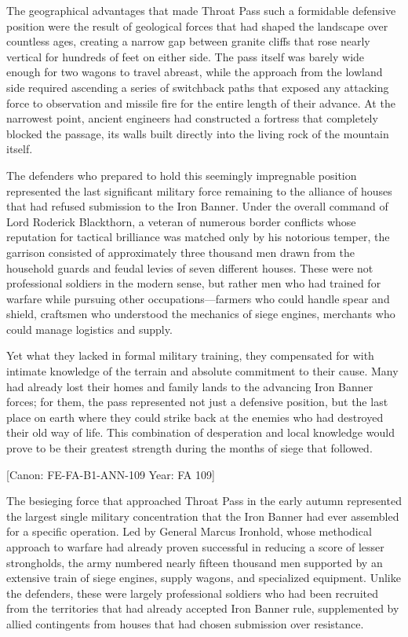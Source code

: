 The geographical advantages that made Throat Pass such a formidable
defensive position were the result of geological forces that had shaped
the landscape over countless ages, creating a narrow gap between granite
cliffs that rose nearly vertical for hundreds of feet on either side.
The pass itself was barely wide enough for two wagons to travel abreast,
while the approach from the lowland side required ascending a series of
switchback paths that exposed any attacking force to observation and
missile fire for the entire length of their advance. At the narrowest
point, ancient engineers had constructed a fortress that completely
blocked the passage, its walls built directly into the living rock of
the mountain itself.

The defenders who prepared to hold this seemingly impregnable position
represented the last significant military force remaining to the
alliance of houses that had refused submission to the Iron Banner. Under
the overall command of Lord Roderick Blackthorn, a veteran of numerous
border conflicts whose reputation for tactical brilliance was matched
only by his notorious temper, the garrison consisted of approximately
three thousand men drawn from the household guards and feudal levies of
seven different houses. These were not professional soldiers in the
modern sense, but rather men who had trained for warfare while pursuing
other occupations---farmers who could handle spear and shield, craftsmen
who understood the mechanics of siege engines, merchants who could
manage logistics and supply.

Yet what they lacked in formal military training, they compensated for
with intimate knowledge of the terrain and absolute commitment to their
cause. Many had already lost their homes and family lands to the
advancing Iron Banner forces; for them, the pass represented not just a
defensive position, but the last place on earth where they could strike
back at the enemies who had destroyed their old way of life. This
combination of desperation and local knowledge would prove to be their
greatest strength during the months of siege that followed.

{[}Canon: FE-FA-B1-ANN-109 \textbar{} Year: FA 109{]}

The besieging force that approached Throat Pass in the early autumn
represented the largest single military concentration that the Iron
Banner had ever assembled for a specific operation. Led by General
Marcus Ironhold, whose methodical approach to warfare had already proven
successful in reducing a score of lesser strongholds, the army numbered
nearly fifteen thousand men supported by an extensive train of siege
engines, supply wagons, and specialized equipment. Unlike the defenders,
these were largely professional soldiers who had been recruited from the
territories that had already accepted Iron Banner rule, supplemented by
allied contingents from houses that had chosen submission over
resistance.

